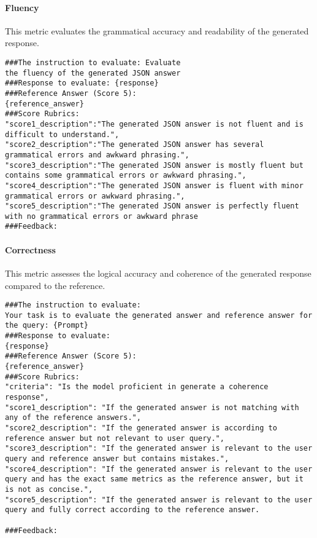 \paragraph{Fluency}
This metric evaluates the grammatical accuracy and readability of the generated response.

\begin{lstlisting}[style=textstyle, frame = single, caption=Prompt structured fluency, label=code:estructured-fluency]
###The instruction to evaluate: Evaluate 
the fluency of the generated JSON answer
###Response to evaluate: {response}
###Reference Answer (Score 5): 
{reference_answer}
###Score Rubrics:
"score1_description":"The generated JSON answer is not fluent and is difficult to understand.",
"score2_description":"The generated JSON answer has several grammatical errors and awkward phrasing.",
"score3_description":"The generated JSON answer is mostly fluent but contains some grammatical errors or awkward phrasing.",
"score4_description":"The generated JSON answer is fluent with minor grammatical errors or awkward phrasing.",
"score5_description":"The generated JSON answer is perfectly fluent with no grammatical errors or awkward phrase
###Feedback:
\end{lstlisting}

\paragraph{Correctness}
This metric assesses the logical accuracy and coherence of the generated response compared to the reference.

\begin{lstlisting}[style=textstyle, frame = single, caption=Prompt estructured correctness, label=code:estructured-correctness]
###The instruction to evaluate:
Your task is to evaluate the generated answer and reference answer for the query: {Prompt}
###Response to evaluate:
{response}
###Reference Answer (Score 5):
{reference_answer}
###Score Rubrics:
"criteria": "Is the model proficient in generate a coherence response",
"score1_description": "If the generated answer is not matching with any of the reference answers.",
"score2_description": "If the generated answer is according to reference answer but not relevant to user query.",
"score3_description": "If the generated answer is relevant to the user query and reference answer but contains mistakes.",
"score4_description": "If the generated answer is relevant to the user query and has the exact same metrics as the reference answer, but it is not as concise.",
"score5_description": "If the generated answer is relevant to the user query and fully correct according to the reference answer.

###Feedback: 
\end{lstlisting}

